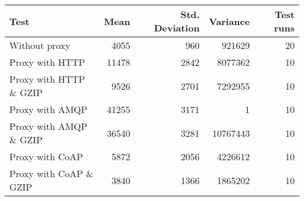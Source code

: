 \begin{tabular}{lrrrr}
\hline
 Test                   &   Mean &   Std. Deviation &   Variance &   Test runs \\
\hline
 Without proxy          &   4055 &              960 &     921629 &          20 \\
 Proxy with HTTP        &  11478 &             2842 &    8077362 &          10 \\
 Proxy with HTTP \& GZIP &   9526 &             2701 &    7292955 &          10 \\
 Proxy with AMQP        &  41255 &             3171 &          1 &          10 \\
 Proxy with AMQP \& GZIP &  36540 &             3281 &   10767443 &          10 \\
 Proxy with CoAP        &   5872 &             2056 &    4226612 &          10 \\
 Proxy with CoAP \& GZIP &   3840 &             1366 &    1865202 &          10 \\
\hline
\end{tabular}